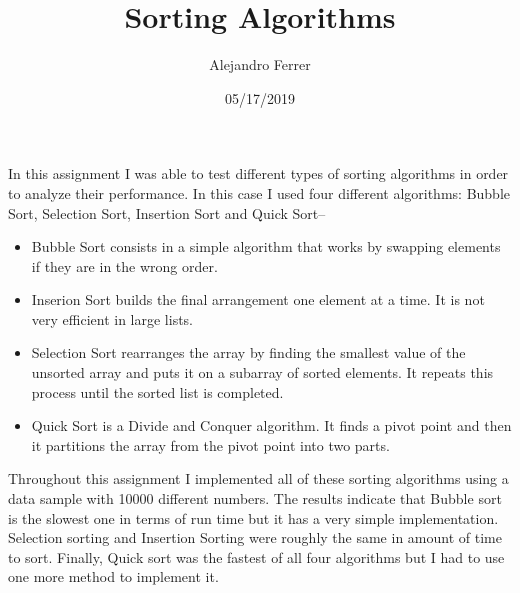 \documentclass[12pt]{article}
\title{Sorting Algorithms}
\author{Alejandro Ferrer}
\date{05/17/2019}
\begin{document}
\maketitle

In this assignment I was able to test different types of sorting algorithms in order to analyze their performance. 
In this case I used four different algorithms: Bubble Sort, Selection Sort, Insertion Sort and Quick Sort--

\begin{itemize}
  \item Bubble Sort consists in a simple algorithm that works by swapping elements if they are in the wrong order. 
  \item Inserion Sort builds the final arrangement one element at a time. It is not very efficient in large lists.
  
  \item Selection Sort rearranges the array by finding the smallest value of the unsorted array and puts it on a subarray of sorted elements. It repeats this process until the sorted list is completed.
  \item Quick Sort is a Divide and Conquer algorithm. It finds a pivot point and then it partitions the array from the pivot point into two parts.

\end{itemize}

Throughout this assignment I implemented all of these sorting algorithms using a data sample with 10000 different numbers. The results indicate that Bubble sort is the slowest one in terms of run time but it has a very simple implementation. Selection sorting and Insertion Sorting were roughly the same in amount of time to sort. Finally, Quick sort was the fastest of all four algorithms but I had to use one more method to implement it.
\end{document}

